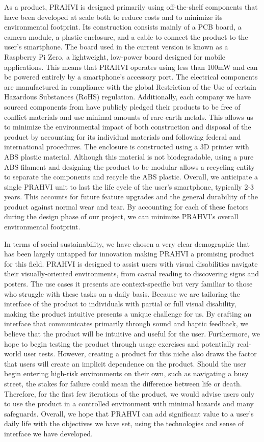 	As a product, PRAHVI is designed primarily using off-the-shelf components that have been developed at scale both to reduce costs and to minimize its environmental footprint. Its construction consists mainly of a PCB board, a camera module, a plastic enclosure, and a cable to connect the product to the user’s smartphone. The board used in the current version is known as a Raspberry Pi Zero, a lightweight, low-power board designed for mobile applications. This means that PRAHVI operates using less than 100mW and can be powered entirely by a smartphone’s accessory port. The electrical components are manufactured in compliance with the global Restriction of the Use of certain Hazardous Substances (RoHS) regulation. Additionally, each company we have sourced components from have publicly pledged their products to be free of conflict materials and use minimal amounts of rare-earth metals. This allows us to minimize the environmental impact of both construction and disposal of the product by accounting for its individual materials and following federal and international procedures. The enclosure is constructed using a 3D printer with ABS plastic material. Although this material is not biodegradable, using a pure ABS filament and designing the product to be modular allows a recycling entity to separate the components and recycle the ABS plastic. Overall, we anticipate a single PRAHVI unit to last the life cycle of the user’s smartphone, typically 2-3 years. This accounts for future feature upgrades and the general durability of the product against normal wear and tear. By accounting for each of these factors during the design phase of our project, we can minimize PRAHVI’s overall environmental footprint.
	
	In terms of social sustainability, we have chosen a very clear demographic that has been largely untapped for innovation making PRAHVI a promising product for this field. PRAHVI is designed to assist users with visual disabilities navigate their visually-oriented environments, from casual reading to discovering signs and posters. The use cases it presents are context-specific but very familiar to those who struggle with these tasks on a daily basis. Because we are tailoring the interface of the product to individuals with partial or full visual disability, making the product intuitive presents a unique challenge for us. By crafting an interface that communicates primarily through sound and haptic feedback, we believe that the product will be intuitive and useful for the user. Furthermore, we hope to begin testing the product through usage exercises and potentially real-world user tests. However, creating a product for this niche also draws the factor that users will create an implicit dependence on the product. Should the user begin entering high-risk environments on their own, such as navigating a busy street, the stakes for failure could mean the difference between life or death. Therefore, for the first few iterations of the product, we would advise users only to use the product in a controlled environment with minimal hazards and many safeguards. Overall, we hope that PRAHVI can add significant value to a user’s daily life with the objectives we have set, using the technologies and sense of interface we have developed.
	
